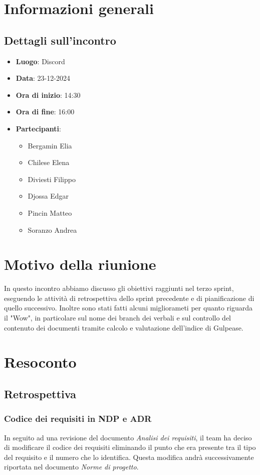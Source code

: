 \section{Informazioni generali}
\subsection{Dettagli sull'incontro}
\begin{itemize}
    \item \textbf{Luogo}: Discord
    \item \textbf{Data}: 23-12-2024
    \item \textbf{Ora di inizio}: 14:30
    \item \textbf{Ora di fine}: 16:00
    \item \textbf{Partecipanti}:
    \begin{itemize}
        \item Bergamin Elia
        \item Chilese Elena
        \item Diviesti Filippo
        \item Djossa Edgar
        \item Pincin Matteo 
        \item Soranzo Andrea  
    \end{itemize}
\end{itemize}

\section{Motivo della riunione}
In questo incontro abbiamo discusso gli obiettivi raggiunti nel terzo sprint, eseguendo le attività di retrospettiva dello sprint precedente e di pianificazione di quello successivo. Inoltre sono stati fatti alcuni migliorameti
per quanto riguarda il "Wow", in particolare sul nome dei branch dei verbali e sul controllo del contenuto dei documenti tramite calcolo e valutazione dell'indice di Gulpease.

\section{Resoconto}
\subsection{Retrospettiva}

\subsubsection{Codice dei requisiti in NDP e ADR}
In seguito ad una revisione del documento \textit{Analisi dei requisiti}, il team ha deciso di modificare il codice dei requisiti eliminando il punto che era presente tra il tipo del requisito e il numero che lo identifica.
Questa modifica andrà successivamente riportata nel documento \textit{Norme di progetto}.

